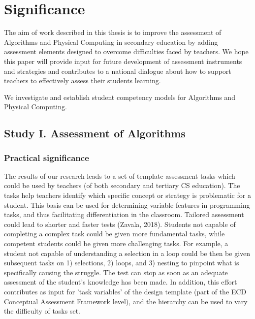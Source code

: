 \section{Significance}\label{sec:significance}


The aim of work described in this thesis is to improve the assessment of Algorithms and Physical Computing in secondary education by adding assessment elements designed to overcome difficulties faced by teachers. We hope this paper will provide input for future development of assessment instruments and strategies and contributes to a national dialogue about how to support teachers to effectively assess their students learning.


We investigate and establish student competency models for Algorithms and Physical Computing.




\subsection{Study I. Assessment of Algorithms}
\subsubsection*{Practical significance}

The results of our research leads to a set of template assessment tasks which could be used by teachers (of both secondary and tertiary CS education). The tasks help teachers identify which specific concept or strategy is problematic for a student. This basis can be used for determining variable features in programming tasks, and thus facilitating differentiation in the classroom. Tailored assessment could lead to shorter and faster tests (Zavala, 2018). Students not capable of completing a complex task could be given more fundamental tasks, while competent students could be given more challenging tasks. For example, a student not capable of understanding a selection in a loop could be then be given subsequent tasks on 1) selections, 2) loops, and 3) nesting to pinpoint what is specifically causing the struggle. The test can stop as soon as an adequate assessment of the student’s knowledge has been made. In addition, this effort contributes as input for 'task variables' of the design template (part of the ECD Conceptual Assessment Framework level), and the hierarchy can be used to vary the difficulty of tasks set.




